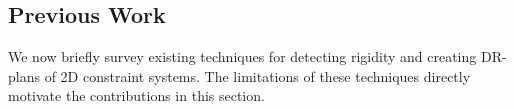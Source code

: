 \subsection{Previous Work}
We now briefly survey existing techniques for detecting rigidity and creating DR-plans of 2D constraint systems. The limitations of these techniques directly motivate the contributions in this section.

